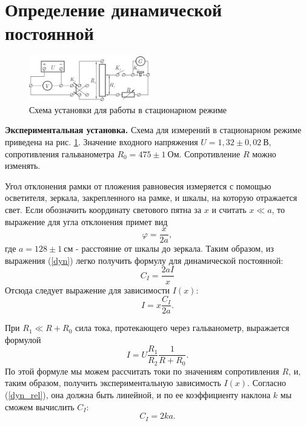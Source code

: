 \documentclass[12pt,a4paper]{article}
\begin{document}
\section{Определение динамической постоянной}
\begin{figure}
\centering\includegraphics[width = 0.47\textwidth]{Sch1}
\captionsetup{justification = centering}
\caption{Схема установки для работы в стационарном режиме \label{Fig2}}
\end{figure}
\textbf{Экспериментальная установка.} Схема для измерений в стационарном режиме приведена на рис. \ref{Fig2}. Значение входного напряжения $U = 1,32 \pm 0,02~\text{В}$, сопротивления гальванометра $R_0 = 475 \pm 1~\text{Ом}$. Сопротивление $R$ можно изменять.

Угол отклонения рамки от пложения равновесия измеряется с помощью осветителя, зеркала, закрепленного на рамке, и шкалы, на которую отражается свет. Если обозначить координату светового пятна за $x$ и считать $x \ll a$, то выражение для угла отклонения примет вид
\begin{equation}
\varphi = \frac{x}{2a},
\end{equation}
где $a = 128 \pm 1~\text{см}$ - расстояние от шкалы до зеркала. Таким образом, из выражения (\ref{dyn}) легко получить формулу для динамической постоянной:
\begin{equation}
C_I = \frac{2aI}{x} 
\end{equation}
Отсюда следует выражение для зависимости $I(x)$:
\begin{equation}
I = x\frac{C_I}{2a}\label{dyn_rel}.
\end{equation}

При $R_1 \ll R + R_0$ сила тока, протекающего через гальванометр, выражается формулой
\begin{equation}
I = U\frac{R_1}{R_2}\frac{1}{R + R_0}.
\end{equation}
По этой формуле мы можем рассчитать токи по значениям сопротивления $R$, и, таким образом, получить экспериментальную зависимость $I(x)$. Согласно (\ref{dyn_rel}), она должна быть линейной, и по ее коэффициенту наклона $k$ мы сможем вычислить $C_I$:
\begin{equation}
C_I = 2ka.\label{dyn_exp}
\end{equation}
\medskip
\end{document}
